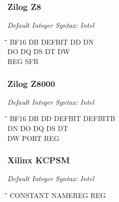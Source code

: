 \subsubsection{Zilog Z8}

{\em Default Integer Syntax: Intel}

{\tt\begin{tabbing}
\hspace{3cm}\=\hspace{3cm}\=\hspace{3cm}\=\hspace{3cm}\=\kill
BF16       \> DB          \> DEFBIT      \> DD          \> DN \\
DO         \> DQ          \> DS          \> DT          \> DW \\
REG        \> SFR \\
\end{tabbing}}

\subsubsection{Zilog Z8000}

{\em Default Integer Syntax: Intel}

{\tt\begin{tabbing}
\hspace{3cm}\=\hspace{3cm}\=\hspace{3cm}\=\hspace{3cm}\=\kill
BF16       \> DB          \> DD          \> DEFBIT      \> DEFBITB \\
DN         \> DO          \> DQ          \> DS          \> DT \\
DW         \> PORT        \> REG         \\
\end{tabbing}}

\subsubsection{Xilinx KCPSM}

{\em Default Integer Syntax: Intel}

{\tt\begin{tabbing}
\hspace{3cm}\=\hspace{3cm}\=\hspace{3cm}\=\hspace{3cm}\=\kill
CONSTANT   \> NAMEREG     \> REG \\
\end{tabbing}}

